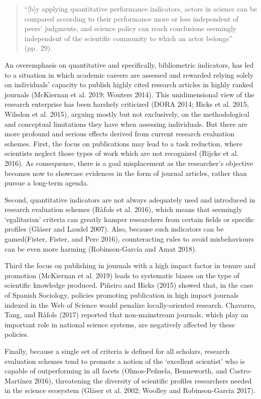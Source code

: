 \documentclass[]{elsarticle} %
\begin{document}
\begin{quote}
``{[}b{]}y applying quantitative performance indicators, actors in
science can be compared according to their performance more or less
independent of peers' judgments, and science policy can reach
conclusions seemingly independent of the scientific community to which
an actor belongs'' (pp.~29).
\end{quote}

An overemphasis on quantitative and specifically, bibliometric
indicators, has led to a situation in which academic careers are
assessed and rewarded relying solely on individuals' capacity to publish
highly cited research articles in highly ranked journals (McKiernan et
al. 2019; Wouters 2014). This unidimensional view of the research
enterprise has been harshely criticized (DORA 2014; Hicks et al. 2015;
Wilsdon et al. 2015), arguing mostly but not exclusively, on the
methodological and conceptual limitations they have when assessing
individuals. But there are more profound and serious effects derived
from current research evaluation schemes. First, the focus on
publications may lead to a task reduction, where scientists neglect
those types of work which are not recognized (Rijcke et al. 2016). As
consequence, there is a goal misplacement as the researcher's objective
becomes now to showcase evidences in the form of journal articles,
rather than pursue a long-term agenda.

Second, quantitative indicators are not always adequately used and
introduced in research evaluation schemes (Ràfols et al. 2016), which
means that seemingly `egalitarian' criteria can greatly hamper
researchers from certain fields or specific profiles (Gläser and Laudel
2007). Also, because such indicators can be gamed(Fister, Fister, and
Perc 2016), counteracting rules to avoid misbehaviours can be even more
harming (Robinson-Garcia and Amat 2018).

Third the focus on publishing in journals with a high impact factor in
tenure and promotion (McKiernan et al. 2019) leads to systematic biases
on the type of scientific knowledge produced. Piñeiro and Hicks (2015)
showed that, in the case of Spanish Sociology, policies promoting
publication in high impact journals indexed in the Web of Science would
penalize locally-oriented research. Chavarro, Tang, and Ràfols (2017)
reported that non-mainstream journals, which play an important role in
national science systems, are negatively affected by these policies.

Finally, because a single set of criteria is defined for all scholars,
research evaluation schemes tend to promote a notion of the `excellent
scientist' who is capable of outperforming in all facets (Olmos-Peñuela,
Benneworth, and Castro-Martínez 2016), threatening the diversity of
scientific profiles researchers needed in the science ecosystem (Gläser
et al. 2002; Woolley and Robinson-Garcia 2017).
\end{document}
